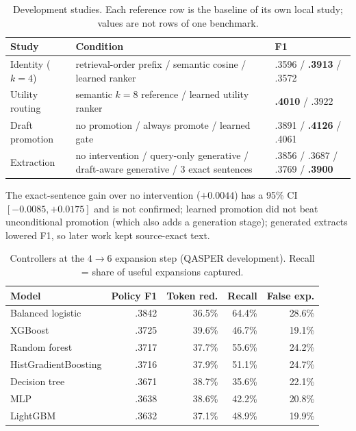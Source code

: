\documentclass[10pt,twocolumn,letterpaper]{article}
\newcommand{\qasper}{\textsc{QASPER}\xspace}
\begin{document}
\begin{table}[H]\centering\footnotesize\setlength{\tabcolsep}{3pt}
\caption{Development studies. Each reference row is the baseline of its own local study; values are not rows of one benchmark.}\label{tab:interm}
\begin{tabularx}{\textwidth}{@{}p{2.5cm}X>{\raggedleft\arraybackslash}p{5.0cm}@{}}\toprule
Study & Condition & F1\\\midrule
Identity ($k{=}4$) & retrieval-order prefix / semantic cosine / learned ranker & .3596 / \textbf{.3913} / .3572\\
Utility routing & semantic $k{=}8$ reference / learned utility ranker & \textbf{.4010} / .3922\\
Draft promotion & no promotion / always promote / learned gate & .3891 / \textbf{.4126} / .4061\\
Extraction & no intervention / query-only generative / draft-aware generative / 3 exact sentences & .3856 / .3687 / .3769 / \textbf{.3900}\\\bottomrule
\end{tabularx}\end{table}
The exact-sentence gain over no intervention ($+0.0044$) has a 95\% CI $[-0.0085,+0.0175]$ and is not confirmed; learned promotion did not beat unconditional promotion (which also adds a generation stage); generated extracts lowered F1, so later work kept source-exact text.

\begin{table}[H]\centering\small\setlength{\tabcolsep}{5pt}
\caption{Controllers at the $4{\to}6$ expansion step (\qasper development). Recall = share of useful expansions captured.}\label{tab:ctrl}
\begin{tabular}{lrrrr}\toprule
Model & Policy F1 & Token red. & Recall & False exp.\\\midrule
Balanced logistic & .3842 & 36.5\% & 64.4\% & 28.6\%\\
XGBoost & .3725 & 39.6\% & 46.7\% & 19.1\%\\
Random forest & .3717 & 37.7\% & 55.6\% & 24.2\%\\
HistGradientBoosting & .3716 & 37.9\% & 51.1\% & 24.7\%\\
Decision tree & .3671 & 38.7\% & 35.6\% & 22.1\%\\
MLP & .3638 & 38.6\% & 42.2\% & 20.8\%\\
LightGBM & .3632 & 37.1\% & 48.9\% & 19.9\%\\\bottomrule
\end{tabular}\end{table}
\end{document}
